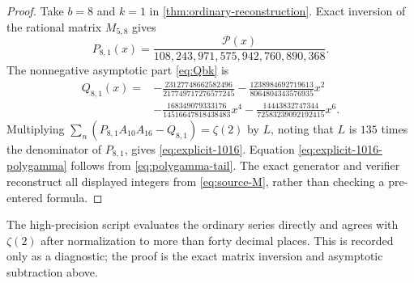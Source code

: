 \begin{proof}
Take $b=8$ and $k=1$ in
\cref{thm:ordinary-reconstruction}.  Exact inversion of the rational
matrix $M_{5,8}$ gives
\[
 P_{8,1}(x)=\frac{\mathscr P(x)}
 {108{,}243{,}971{,}575{,}942{,}760{,}890{,}368}.
\]
The nonnegative asymptotic part \eqref{eq:Qbk} is
\begin{align*}
 Q_{8,1}(x)={}&-\frac{23127748662582496}{217749717276577245}
 -\frac{1238984692719613}{8064804343576935}x^2\\
 &-\frac{168349079333176}{14516647818438483}x^4
 -\frac{14443832747344}{72583239092192415}x^6.
\end{align*}
Multiplying
$\sum_n(P_{8,1}A_{10}A_{16}-Q_{8,1})=\zeta(2)$ by $L$, noting that
$L$ is $135$ times the denominator of $P_{8,1}$, gives
\eqref{eq:explicit-1016}.  Equation
\eqref{eq:explicit-1016-polygamma} follows from
\eqref{eq:polygamma-tail}.  The exact generator and verifier reconstruct
all displayed integers from \eqref{eq:source-M}, rather than checking a
pre-entered formula.
\end{proof}

The high-precision script evaluates the ordinary series directly and
agrees with $\zeta(2)$ after normalization to more than forty decimal
places.  This is recorded only as a diagnostic; the proof is the exact
matrix inversion and asymptotic subtraction above.

